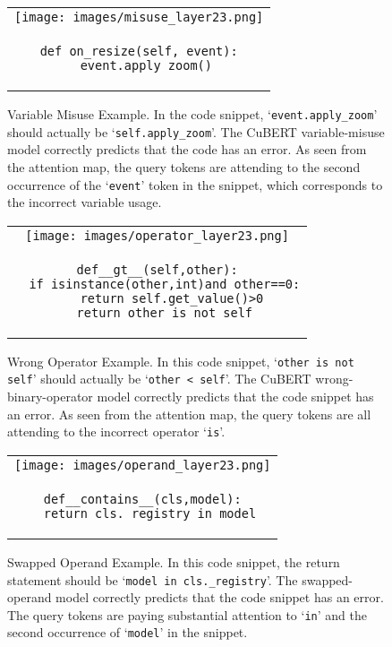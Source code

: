 \documentclass{article}
\begin{document}
\begin{figure*}
    \centering
    \begin{tabular}{c}
    \texttt{[image: images/misuse\_layer23.png]}\\
    \begin{lstlisting}[linewidth=0.5\textwidth]
def on_resize(self, event):
  event.apply_zoom()
    \end{lstlisting} 
    \end{tabular}
    \caption{Variable Misuse Example. In the code snippet, `{\tt event.apply\_zoom}' should actually be `{\tt self.apply\_zoom}'. The CuBERT variable-misuse model correctly predicts that the code has an error. As seen from the attention map, the query tokens are attending to the second occurrence of the `{\tt event}' token in the snippet, which corresponds to the incorrect variable usage.}
    \label{fig:misuse_visualization}
\end{figure*}
\begin{figure*}
    \centering
    \begin{tabular}{c}
    \texttt{[image: images/operator\_layer23.png]}\\
    \begin{lstlisting}[linewidth=0.6\textwidth]
def__gt__(self,other):
  if isinstance(other,int)and other==0:
    return self.get_value()>0
  return other is not self
      \end{lstlisting} 
    \end{tabular}
    \caption{Wrong Operator Example. In this code snippet, `\texttt{other is not self}' should actually be `\texttt{other < self}'. The CuBERT wrong-binary-operator model correctly predicts that the code snippet has an error. As seen from the attention map, the query tokens are all attending to the incorrect operator `\texttt{is}'.}
    \label{fig:operator_visualization}
\end{figure*}
\begin{figure*}
    \centering
    \begin{tabular}{c}
    \texttt{[image: images/operand\_layer23.png]}\\
    \begin{lstlisting}[linewidth=0.5\textwidth]
def__contains__(cls,model):
  return cls._registry in model
      \end{lstlisting} 
    \end{tabular}
    \caption{Swapped Operand Example. In this code snippet, the return statement should be `\texttt{model in cls.\_registry}'. The 
    swapped-operand model correctly predicts that the code snippet has an error. The query tokens are paying substantial attention to `\texttt{in}' and the second occurrence of `\texttt{model}' in the snippet.}
    \label{fig:operand_visualization}
\end{figure*}
\end{document}
